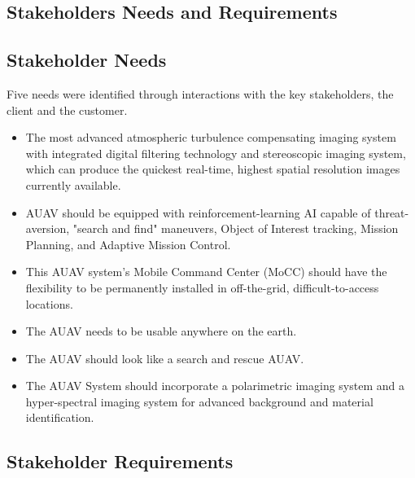 \begin{fullwidth}
\section{Stakeholders Needs and Requirements}
\subsection{Stakeholder Needs}
Five needs were identified through interactions with the key stakeholders, the client and the customer.
\begin{itemize}
    \item{The most advanced atmospheric turbulence compensating imaging system with integrated digital filtering technology and stereoscopic imaging system, which can produce the quickest real-time, highest spatial resolution images currently available.}
    \item{AUAV should be equipped with reinforcement-learning AI capable of threat-aversion, "search and find" maneuvers, Object of Interest tracking, Mission Planning, and Adaptive Mission Control.}
    \item{This AUAV system's Mobile Command Center (MoCC) should have the flexibility to be permanently installed in off-the-grid, difficult-to-access locations.}
    \item{The AUAV needs to be usable anywhere on the earth.}
    \item{The AUAV should look like a search and rescue AUAV.}
    \item{The AUAV System should incorporate a polarimetric imaging system and a hyper-spectral imaging system for advanced background and material identification.}
\end{itemize}
 
\subsection{Stakeholder Requirements}

\end{fullwidth}
